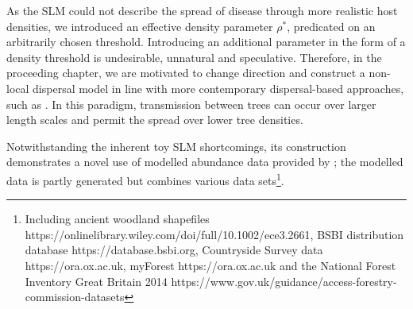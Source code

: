 As the SLM could not describe the spread of disease through more realistic host densities, 
we introduced an effective density parameter $\rho^*$, predicated on an arbitrarily chosen threshold.
Introducing an additional parameter in the form of a density threshold is undesirable, unnatural and speculative.
Therefore, in the proceeding chapter, we are motivated to change direction and construct a non-local
dispersal model in line with more contemporary dispersal-based approaches, such as \cite{parnell2009optimal, meentemeyer2011epidemiological}.
In this paradigm, transmission between trees can occur over larger length scales and permit the spread over lower tree densities. 


Notwithstanding the inherent toy SLM shortcomings, its construction demonstrates a novel use of modelled abundance
data provided by \cite{hill.data};
the modelled data is partly generated but combines various data sets\footnote{
Including ancient woodland shapefiles https://onlinelibrary.wiley.com/doi/full/10.1002/ece3.2661, BSBI distribution database https://database.bsbi.org, Countryside Survey data https://ora.ox.ac.uk, myForest https://ora.ox.ac.uk and the National Forest Inventory Great Britain 2014 https://www.gov.uk/guidance/access-forestry-commission-datasets}.



\newpage
